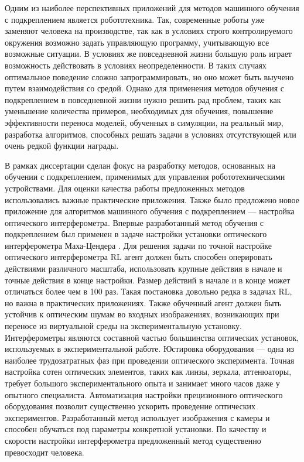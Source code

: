 {\actuality} Одним из наиболее перспективных приложений для методов машинного обучения с подкреплением является робототехника. Так, современные роботы уже заменяют человека на производстве, так как в условиях строго контролируемого окружения возможно задать управляющую программу, учитывающую все возможные ситуации. В условиях же повседневной жизни большую роль играет возможность действовать в условиях неопределенности. В таких случаях оптимальное поведение сложно запрограммировать, но оно может быть выучено путем взаимодействия со средой. Однако для применения методов обучения с подкреплением в повседневной жизни нужно решить рад проблем, таких как уменьшение количества примеров, необходимых для обучения, повышение эффективности переноса моделей, обученных в симуляции, на реальный мир, разработка алгоритмов, способных решать задачи в условиях отсутствующей или очень редкой функции награды. 

В рамках диссертации сделан фокус на разработку методов, основанных на обучении с подкреплением, применимых для управления робототехническими устройствами. Для оценки качества работы предложенных методов использовались важные практические приложения. Также было предложено новое приложение для алгоритмов машинного обучения с подкреплением --- настройка оптического интерферометра. Впервые разработанный метод обучения с подкреплением был применен в задаче настройки установки оптического интерферометра Маха-Цендера \cite{interferobot, v2}. Для решения задачи по точной настройке оптического интерферометра RL агент должен быть способен оперировать действиями различного масштаба, использовать крупные действия в начале и точные действия в конце настройки. Размер действий в начале и в конце может отличаться более чем в 100 раз. Такая постановка довольно редка в задачах RL, но важна в практических приложениях. Также обученный агент должен быть устойчив к оптическим шумам во входных изображениях, возникающих при переносе из виртуальной среды на экспериментальную установку. Интерферометры являются составной частью большинства оптических установок, используемых в экспериментальной работе. Юстировка оборудования --- одна из наиболее трудозатратных фаз при проведении оптического эксперимента. Точная настройка сотен оптических элементов, таких как линзы, зеркала, аттенюаторы, требует большого экспериментального опыта и занимает много часов даже у опытного специалиста. Автоматизация настройки прецизионного оптического оборудования позволит существенно ускорить проведение оптических экспериментов. Разработанный метод использует изображения с камеры и способен обучаться под параметры конкретной установки. По качеству и скорости настройки интерферометра предложенный метод существенно превосходит человека. 

